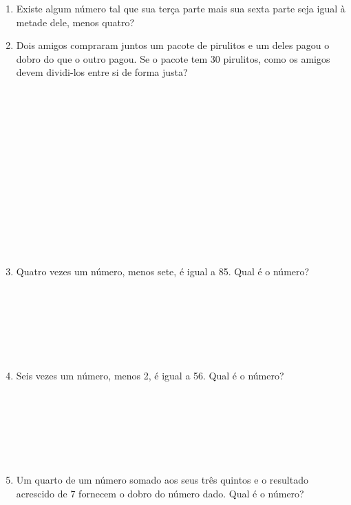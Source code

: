 \documentclass[a4paper,14pt]{article}
\begin{document}
\begin{multicols}{2}
\begin{enumerate}
			\item Existe algum número tal que sua terça parte mais sua sexta parte seja igual à metade dele, menos quatro? \newpage
			\item Dois amigos compraram juntos um pacote de pirulitos e um deles pagou o dobro do que o outro pagou. Se o pacote tem 30 pirulitos, como os amigos devem dividi-los entre si de forma justa? \\\\\\\\\\\\\\\\\\\\\\\\\\\\
			\item Quatro vezes um número, menos sete, é igual a 85. Qual é o número? \\\\\\\\\\\\\\
			\item Seis vezes um número, menos 2, é igual a 56. Qual é o número? \\\\\\\\\\\\\\
			\item Um quarto de um número somado aos seus três quintos e o resultado acrescido de 7 fornecem o dobro do número dado. Qual é o número? \\\\\\\\\\\\\\\\\\\\\\\\\\\\\\

\end{enumerate}
\end{multicols}
\end{document}
